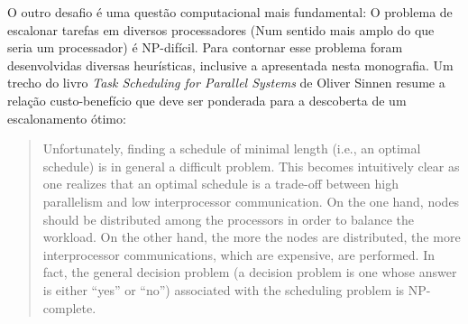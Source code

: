 O outro desafio é uma questão computacional mais fundamental: O problema de 
escalonar tarefas em diversos processadores (Num sentido mais amplo do que seria
um processador) é NP-difícil. \cite{sinnen:task_scheduling_parallel_systems}
Para contornar esse problema foram desenvolvidas diversas heurísticas, inclusive
a apresentada nesta monografia. Um trecho do livro
\emph{Task Scheduling for Parallel Systems} de Oliver Sinnen resume a relação
custo-benefício que deve ser ponderada para a descoberta de um escalonamento
ótimo:

\begin{quote}
Unfortunately, finding a schedule of minimal length (i.e., an optimal schedule)
is in general a difficult problem. This becomes intuitively clear as one realizes that
an optimal schedule is a trade-off between high parallelism and low interprocessor
communication. On the one hand, nodes should be distributed among the processors
in order to balance the workload. On the other hand, the more the nodes are distributed,
the more interprocessor communications, which are expensive, are performed. In fact,
the general decision problem (a decision problem is one whose answer is either ``yes''
or ``no'') associated with the scheduling problem is NP-complete. 
\cite{sinnen:task_scheduling_parallel_systems}
\end{quote}



